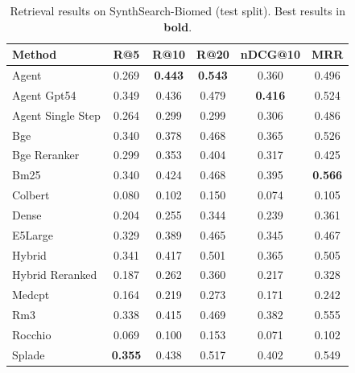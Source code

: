 \begin{table}[t]
\centering
\caption{Retrieval results on SynthSearch-Biomed (test split). Best results in \textbf{bold}.}
\label{tab:main_results}
\begin{tabular}{lccccc}
\toprule
Method & R@5 & R@10 & R@20 & nDCG@10 & MRR \\
\midrule
Agent & 0.269 & \textbf{0.443} & \textbf{0.543} & 0.360 & 0.496 \\
Agent Gpt54 & 0.349 & 0.436 & 0.479 & \textbf{0.416} & 0.524 \\
Agent Single Step & 0.264 & 0.299 & 0.299 & 0.306 & 0.486 \\
Bge & 0.340 & 0.378 & 0.468 & 0.365 & 0.526 \\
Bge Reranker & 0.299 & 0.353 & 0.404 & 0.317 & 0.425 \\
Bm25 & 0.340 & 0.424 & 0.468 & 0.395 & \textbf{0.566} \\
Colbert & 0.080 & 0.102 & 0.150 & 0.074 & 0.105 \\
Dense & 0.204 & 0.255 & 0.344 & 0.239 & 0.361 \\
E5Large & 0.329 & 0.389 & 0.465 & 0.345 & 0.467 \\
Hybrid & 0.341 & 0.417 & 0.501 & 0.365 & 0.505 \\
Hybrid Reranked & 0.187 & 0.262 & 0.360 & 0.217 & 0.328 \\
Medcpt & 0.164 & 0.219 & 0.273 & 0.171 & 0.242 \\
Rm3 & 0.338 & 0.415 & 0.469 & 0.382 & 0.555 \\
Rocchio & 0.069 & 0.100 & 0.153 & 0.071 & 0.102 \\
Splade & \textbf{0.355} & 0.438 & 0.517 & 0.402 & 0.549 \\
\bottomrule
\end{tabular}
\end{table}